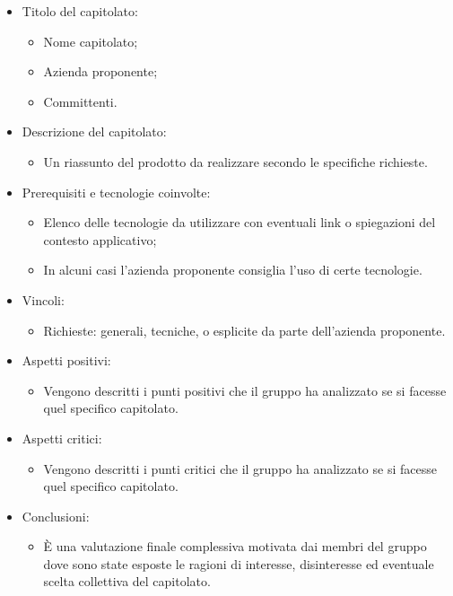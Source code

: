 \begin{itemize}
\item Titolo del capitolato:
	\begin{itemize}
	\item Nome capitolato;
	\item Azienda proponente;
	\item Committenti.
	\end{itemize}
\item Descrizione del capitolato:
	\begin{itemize}
	\item Un riassunto del prodotto da realizzare secondo le specifiche richieste.
	\end{itemize}
\item Prerequisiti e tecnologie coinvolte:
	\begin{itemize}
	\item Elenco delle tecnologie da utilizzare con eventuali link o spiegazioni del contesto applicativo;
	\item In alcuni casi l'azienda proponente consiglia l'uso di certe tecnologie.
	\end{itemize}
\item Vincoli:
	\begin{itemize}
	\item Richieste: generali, tecniche, o esplicite da parte dell'azienda proponente.
	\end{itemize}
\item Aspetti positivi:
	\begin{itemize}
	\item Vengono descritti i punti positivi che il gruppo ha analizzato se si facesse quel specifico capitolato.
	\end{itemize}
\item Aspetti critici:
	\begin{itemize}
	\item Vengono descritti i punti critici che il gruppo ha analizzato se si facesse quel specifico capitolato.
	\end{itemize}
\item Conclusioni:
	\begin{itemize}
	\item È una valutazione finale complessiva motivata dai membri del gruppo dove sono state esposte le ragioni di interesse, disinteresse ed eventuale scelta collettiva del capitolato.
	\end{itemize}
\end{itemize}


